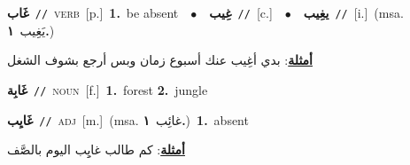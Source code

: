 \documentclass[10pt,a4paper,twoside]{article} %
\begin{document}
\begin{multicols}{2}
{\setlength\topsep{0pt}\textbf{\foreignlanguage{arabic}{غَاب}}\ {\color{gray}\texttt{//}\color{black}}\ \textsc{verb}\ [p.]\ \textbf{1.}~be absent\ \ $\bullet$\ \ \setlength\topsep{0pt}\textbf{\foreignlanguage{arabic}{غِيب}}\ {\color{gray}\texttt{//}\color{black}}\ [c.]\ \ $\bullet$\ \ \setlength\topsep{0pt}\textbf{\foreignlanguage{arabic}{يغِيب}}\ {\color{gray}\texttt{//}\color{black}}\ [i.]\ \color{gray}(msa. \foreignlanguage{arabic}{يَغِيب}~\foreignlanguage{arabic}{\textbf{١.}})\color{black}\  \begin{flushright}\color{gray}\foreignlanguage{arabic}{\textbf{\underline{\foreignlanguage{arabic}{أمثلة}}}: بدي أغِيب عنك أسبوع زمان وبس أرجع بشوف الشغل}\end{flushright}\color{black}} \vspace{2mm}

{\setlength\topsep{0pt}\textbf{\foreignlanguage{arabic}{غَابِة}}\ {\color{gray}\texttt{//}\color{black}}\ \textsc{noun}\ [f.]\ \textbf{1.}~forest  \textbf{2.}~jungle\ } \vspace{2mm}

{\setlength\topsep{0pt}\textbf{\foreignlanguage{arabic}{غَايِب}}\ {\color{gray}\texttt{//}\color{black}}\ \textsc{adj}\ [m.]\ \color{gray}(msa. \foreignlanguage{arabic}{غائِب}~\foreignlanguage{arabic}{\textbf{١.}})\color{black}\ \textbf{1.}~absent\  \begin{flushright}\color{gray}\foreignlanguage{arabic}{\textbf{\underline{\foreignlanguage{arabic}{أمثلة}}}: كم طالب غايِِب اليوم بالصَّف}\end{flushright}\color{black}} \vspace{2mm}


\end{multicols}
\end{document}

